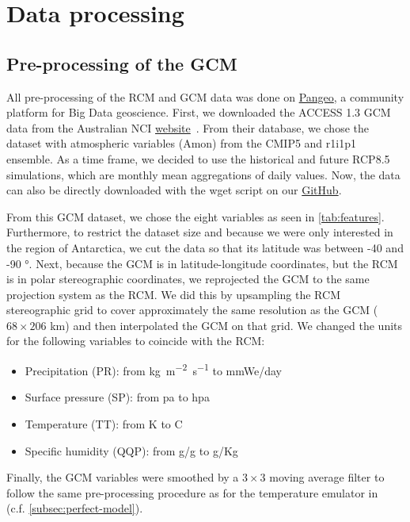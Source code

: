 \documentclass[a4paper,11pt,oneside]{report}
\begin{document}
\chapter{Data processing}

\section{Pre-processing of the GCM}\label{sec:preproc-GCM}

All pre-processing of the RCM and GCM data was done on \href{https://pangeo.io/about.html}{Pangeo}, a community platform for Big Data geoscience. First, we downloaded the ACCESS 1.3 GCM data from the Australian NCI \href{https://esgf.nci.org.au/search/esgf-nci/}{website}~\cite{NCI}. From their database, we chose the dataset with atmospheric variables (Amon) from the CMIP5 and r1i1p1 ensemble. As a time frame, we decided to use the historical and future RCP8.5 simulations, which are monthly mean aggregations of daily values. Now, the data can also be directly downloaded with the wget script on our \href{https://github.com/marvande/master-thesis}{GitHub}. 

From this GCM dataset, we chose the eight variables as seen in \autoref{tab:features}. Furthermore, to restrict the dataset size and because we were only interested in the region of Antarctica, we cut the data so that its latitude was between -40 and -90 $\si{\degree}$. Next, because the GCM is in latitude-longitude coordinates, but the RCM is in polar stereographic coordinates, we reprojected the GCM to the same projection system as the RCM. We did this by upsampling the RCM stereographic grid to cover approximately the same resolution as the GCM ($68 \times 206$ \si{km}) and then interpolated the GCM on that grid. We changed the units for the following variables to coincide with the RCM: 
\begin{itemize}
        \item Precipitation (PR): from \si{kg m^{-2}s^{-1}} to \si{mmWe/day}
        \item Surface pressure (SP): from \si{pa} to \si{hpa}
        \item Temperature (TT): from \si{K} to \si{C}
        \item Specific humidity (QQP): from \si{g/g} to \si{g/Kg}
    \end{itemize}
Finally, the GCM variables were smoothed by a $3\times3$ moving average filter to follow the same pre-processing procedure as for the temperature emulator in~\cite{Doury} (c.f. \autoref{subsec:perfect-model}). 
\end{document}

